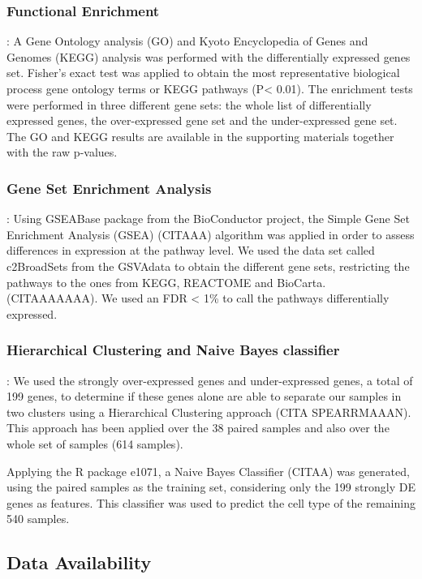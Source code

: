 \documentclass[9pt,twocolumn,twoside]{gsajnl}
\begin{document}
\subsubsection*{Functional Enrichment}
: A Gene Ontology analysis (GO) and Kyoto Encyclopedia of Genes and Genomes (KEGG) analysis was performed with the differentially expressed genes set. Fisher's exact test was applied to obtain the most representative biological process gene ontology terms or KEGG pathways (P< 0.01). The enrichment tests were performed in three different gene sets: the whole list of differentially expressed genes, the over-expressed gene set and the under-expressed gene set. The GO and KEGG results are available in the supporting materials together with the raw p-values.

\subsubsection*{Gene Set Enrichment Analysis}
:  Using GSEABase package from the BioConductor project, the Simple Gene Set Enrichment Analysis (GSEA) (CITAAA) algorithm was applied in order to assess differences in  expression at the pathway level. We used the data set called c2BroadSets from the GSVAdata to obtain the different gene sets, restricting the pathways to the ones from KEGG, REACTOME and BioCarta. (CITAAAAAAA). We used an FDR < 1\% to call the pathways differentially expressed.

\subsubsection*{Hierarchical Clustering and Naive Bayes classifier}
: We used the strongly over-expressed genes and under-expressed genes, a total of 199 genes, to determine if these genes alone are able to separate our samples in two clusters using a Hierarchical Clustering approach (CITA SPEARRMAAAN). This approach has been applied over the 38 paired samples and also over the whole set of samples (614 samples).

Applying the R package e1071, a Naive Bayes Classifier (CITAA) was generated, using the paired samples as the training set, considering only the 199 strongly DE genes as features. This classifier was used to predict the cell type of the remaining 540 samples. 

\subsection*{Data Availability}
\end{document}

